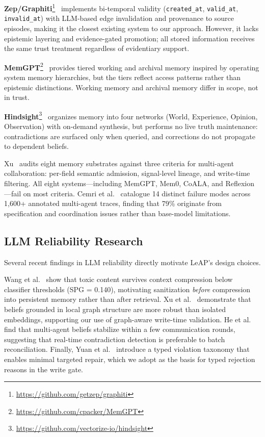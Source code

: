 \documentclass[11pt,letterpaper]{article}
\begin{document}
\textbf{Zep/Graphiti}\footnote{\url{https://github.com/getzep/graphiti}}~\cite{graphiti2025} implements bi-temporal validity (\texttt{created\_at}, \texttt{valid\_at}, \texttt{invalid\_at}) with LLM-based edge invalidation and provenance to source episodes, making it the closest existing system to our approach. However, it lacks epistemic layering and evidence-gated promotion; all stored information receives the same trust treatment regardless of evidentiary support.

\textbf{MemGPT}\footnote{\url{https://github.com/cpacker/MemGPT}}~\cite{memgpt2023} provides tiered working and archival memory inspired by operating system memory hierarchies, but the tiers reflect access patterns rather than epistemic distinctions. Working memory and archival memory differ in scope, not in trust.

\textbf{Hindsight}\footnote{\url{https://github.com/vectorize-io/hindsight}}~\cite{hindsight} organizes memory into four networks (World, Experience, Opinion, Observation) with on-demand synthesis, but performs no live truth maintenance: contradictions are surfaced only when queried, and corrections do not propagate to dependent beliefs.

Xu~\cite{xu2026mmp} audits eight memory substrates against three criteria for multi-agent collaboration: per-field semantic admission, signal-level lineage, and write-time filtering. All eight systems---including MemGPT, Mem0, CoALA, and Reflexion---fail on most criteria. Cemri et al.~\cite{cemri2025} catalogue 14 distinct failure modes across 1,600+ annotated multi-agent traces, finding that 79\% originate from specification and coordination issues rather than base-model limitations.

\subsection{LLM Reliability Research}

Several recent findings in LLM reliability directly motivate LeAP's design choices.

Wang et al.~\cite{wang2026contamination} show that toxic content survives context compression below classifier thresholds (SPG = 0.140), motivating sanitization \textit{before} compression into persistent memory rather than after retrieval. Xu et al.~\cite{xu2026ncb} demonstrate that beliefs grounded in local graph structure are more robust than isolated embeddings, supporting our use of graph-aware write-time validation. He et al.~\cite{he2026collective} find that multi-agent beliefs stabilize within a few communication rounds, suggesting that real-time contradiction detection is preferable to batch reconciliation. Finally, Yuan et al.~\cite{yuan2026saver} introduce a typed violation taxonomy that enables minimal targeted repair, which we adopt as the basis for typed rejection reasons in the write gate.
\end{document}
